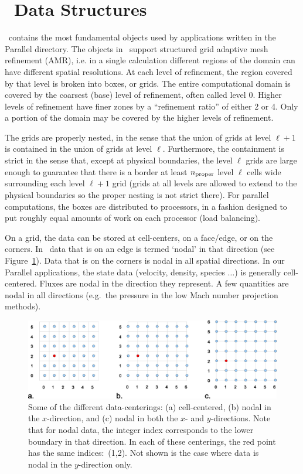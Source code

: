 \section{\BoxLib\ Data Structures}

\BoxLib\ contains the most fundamental objects used by applications written
in the Parallel directory. The objects in \BoxLib\ support structured
grid adaptive mesh refinement (AMR), i.e. in a single calculation
different regions of the domain can have different spatial resolutions.  
At each level of refinement, the region covered by that level is broken
into boxes, or grids.  The entire computational domain is covered by
the coarsest (base) level of refinement, often called level 0. 
Higher levels of refinement have finer zones by a ``refinement ratio''
of either 2 or 4.  Only a portion of the domain may
be covered by the higher levels of refinement.  

The grids are properly nested, in the sense that the union of grids
at level $\ell+1$ is contained in the union of grids at level $\ell$.
Furthermore, the containment is strict in the sense that,
except at physical boundaries,
the level $\ell$ grids are large enough to guarantee that there is
a border at least $n_{\rm proper}$ level $\ell$ cells wide surrounding each level
$\ell +1$ grid (grids at all levels are allowed to extend to the physical
boundaries so the proper nesting is not strict there).
For parallel computations, the boxes are distributed to processors, in
a fashion designed to put roughly equal amounts of work on each
processor (load balancing).

On a grid, the data can be stored at cell-centers, on a face/edge, or
on the corners.  In \BoxLib\, data that is on an edge is termed `nodal'
in that direction (see Figure~\ref{fig:dataloc}).  Data that is on the
corners is nodal in all spatial directions.  In our Parallel applications, 
the state data (velocity, density, species $\ldots$) is generally
cell-centered.  Fluxes are nodal in the direction they represent.
A few quantities are nodal in all directions (e.g.\ the pressure in
the low Mach number projection methods).

\begin{figure}[h]
\centering
\includegraphics[width=6.5in]{./BoxLib/data_loc2}
\caption{\label{fig:dataloc} Some of the different data-centerings:
(a) cell-centered, (b) nodal in the $x$-direction, and (c) nodal in
both the $x$- and $y$-directions.  Note that for nodal data, the
integer index corresponds to the lower boundary in that direction.
In each of these centerings, the red point has the same indices:\ (1,2).
Not shown is the case where data is nodal in the $y$-direction only.}
\end{figure}

